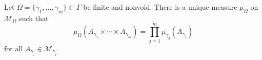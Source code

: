 Let $\Omega = \{\gamma_1,\ldots,\gamma_m\} \subset \Gamma$ be finite and nonvoid. There is a unique measure $\mu_\Omega$ on $\mathcal{M}_\Omega$ such that
$$\mu_\Omega(A_{\gamma_1} \times \cdots \times A_{\gamma_m}) = \prod_{j=1}^m \mu_{\gamma_j}(A_{\gamma_j})$$
for all $A_{\gamma_j} \in \mathcal{M}_{\gamma_j}$.
